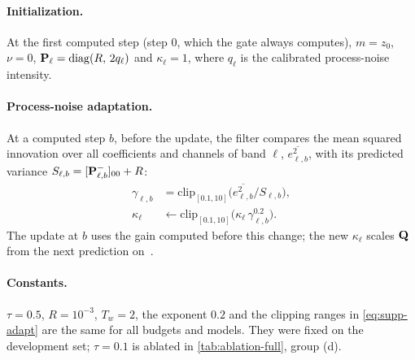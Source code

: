 \paragraph{Initialization.}
At the first computed step (step 0, which the gate always computes), $m=z_0$, $\nu=0$,
$\mathbf{P}_\ell=\mathrm{diag}(R,\,2q_\ell)$ and $\kappa_\ell=1$, where $q_\ell$ is the calibrated process-noise intensity.

\paragraph{Process-noise adaptation.}
At a computed step $b$, before the update, the filter compares the mean squared innovation over all coefficients and
channels of band $\ell$, $\overline{e^2_{\ell,b}}$, with its predicted variance $S_{\ell,b}=[\mathbf{P}^{-}_{\ell,b}]_{00}+R$:
\begin{equation}
  \begin{split}
    \gamma_{\ell,b}&=\mathrm{clip}_{[0.1,10]}\big(\overline{e^2_{\ell,b}}/S_{\ell,b}\big),\\
    \kappa_\ell&\gets\mathrm{clip}_{[0.1,10]}\big(\kappa_\ell\,\gamma_{\ell,b}^{0.2}\big).
  \end{split}
  \label{eq:supp-adapt}
\end{equation}
The update at $b$ uses the gain computed before this change; the new $\kappa_\ell$ scales $\mathbf{Q}$ from the next
prediction on~\cite{mehra1972approaches}.

\paragraph{Constants.}
$\tau=0.5$, $R=10^{-3}$, $T_w=2$, the exponent $0.2$ and the clipping ranges in \eqref{eq:supp-adapt} are the same for
all budgets and models. They were fixed on the development set; $\tau=0.1$ is ablated in \cref{tab:ablation-full}, group (d).



